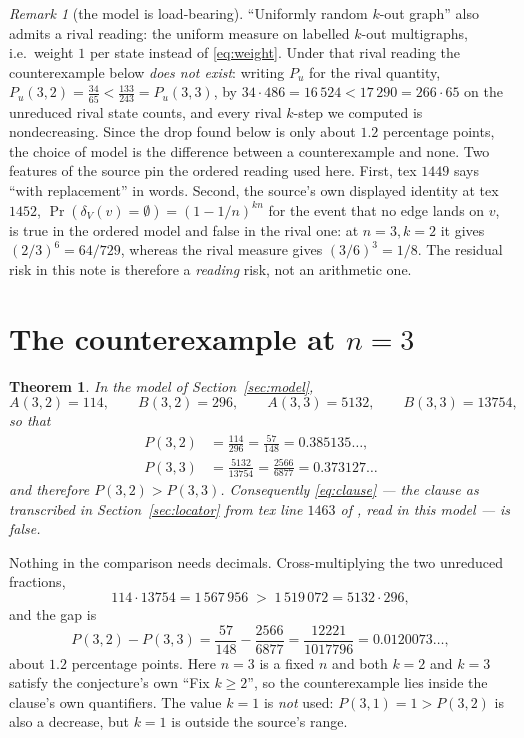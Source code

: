\documentclass[11pt]{amsart}
\newtheorem{theorem}{Theorem}
\theoremstyle{remark}
\newtheorem*{remark}{Remark}
\begin{document}
\begin{remark}[the model is load-bearing]\label{rem:model}
``Uniformly random $k$-out graph'' also admits a rival reading: the uniform measure on
labelled $k$-out multigraphs, i.e.\ weight $1$ per state instead of \eqref{eq:weight}.
Under that rival reading the counterexample below \emph{does not exist}: writing $P_u$ for
the rival quantity, $P_u(3,2)=\tfrac{34}{65}<\tfrac{133}{243}=P_u(3,3)$, by
$34\cdot486=16\,524<17\,290=266\cdot65$ on the unreduced rival state counts, and every
rival $k$-step we computed is nondecreasing.  Since the drop found below is only about
$1.2$ percentage points, the choice of model is the difference between a counterexample and
none.  Two features of the source pin the ordered reading used here.  First, tex $1449$ says ``with replacement'' in words.
Second, the source's own displayed identity at tex $1452$,
$\Pr(\delta_V(v)=\emptyset)=(1-1/n)^{kn}$ for the event that no edge lands on $v$, is true
in the ordered model and false in the rival one: at $n=3,k=2$ it gives
$(2/3)^6=64/729$, whereas the rival measure gives $(3/6)^3=1/8$.  The residual risk in
this note is therefore a \emph{reading} risk, not an arithmetic one.
\end{remark}

\section{The counterexample at $n=3$}
\label{sec:refutation}

\begin{theorem}\label{thm:main}
In the model of Section~\ref{sec:model},
\[
  A(3,2)=114,\qquad B(3,2)=296,\qquad A(3,3)=5132,\qquad B(3,3)=13754,
\]
so that
\begin{align*}
  P(3,2)&=\frac{114}{296}=\frac{57}{148}=0.385135\ldots,\\
  P(3,3)&=\frac{5132}{13754}=\frac{2566}{6877}=0.373127\ldots
\end{align*}
and therefore $P(3,2)>P(3,3)$.  Consequently \eqref{eq:clause} --- the clause as
transcribed in Section~\ref{sec:locator} from tex line $1463$ of \cite{DR}, read in this
model --- is false.
\end{theorem}

Nothing in the comparison needs decimals.  Cross-multiplying the two unreduced fractions,
\begin{equation}\label{eq:cross}
  114\cdot13754=1\,567\,956
  \;>\;
  1\,519\,072=5132\cdot296,
\end{equation}
and the gap is
\begin{equation}\label{eq:drop}
  P(3,2)-P(3,3)=\frac{57}{148}-\frac{2566}{6877}=\frac{12221}{1017796}=0.0120073\ldots,
\end{equation}
about $1.2$ percentage points.  Here $n=3$ is a fixed $n$ and both $k=2$ and $k=3$ satisfy
the conjecture's own ``Fix $k\ge2$'', so the counterexample lies inside the clause's own
quantifiers.  The value $k=1$ is \emph{not} used: $P(3,1)=1>P(3,2)$ is also a decrease, but
$k=1$ is outside the source's range.
\end{document}
